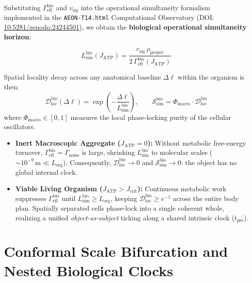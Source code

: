 \documentclass[11pt,a4paper]{article}
\begin{document}
Substituting $\Gamma_{\mathrm{eff}}^{\mathrm{bio}}$ and $v_{\mathrm{sig}}$ into the operational simultaneity formalism implemented in the \texttt{AEON-T14.html} Computational Observatory (DOI: \href{https://doi.org/10.5281/zenodo.24244501}{10.5281/zenodo.24244501}), we obtain the \textbf{biological operational simultaneity horizon}:
\begin{formulabox}
\begin{equation}
L_{\mathrm{sim}}^{\mathrm{bio}}(J_{\mathrm{ATP}}) = \frac{v_{\mathrm{sig}}\,\rho_{\mathrm{proper}}}{2\,\Gamma_{\mathrm{eff}}^{\mathrm{bio}}(J_{\mathrm{ATP}})}
\label{eq:lsim_bio}
\end{equation}
\end{formulabox}
Spatial locality decay across any anatomical baseline $\Delta\ell$ within the organism is then:
\begin{equation}
\mathcal{D}_{\mathrm{loc}}^{\mathrm{bio}}(\Delta\ell) = \exp\!\left(-\frac{\Delta\ell}{L_{\mathrm{sim}}^{\mathrm{bio}}}\right), \qquad \mathcal{S}_{\mathrm{sim}}^{\mathrm{bio}} = \Phi_{\mathrm{macro}} \cdot \mathcal{D}_{\mathrm{loc}}^{\mathrm{bio}}
\label{eq:dloc_bio}
\end{equation}
where $\Phi_{\mathrm{macro}} \in [0, 1]$ measures the local phase-locking purity of the cellular oscillators.

\begin{itemize}
    \item \textbf{Inert Macroscopic Aggregate ($J_{\mathrm{ATP}} = 0$):} Without metabolic free-energy turnover, $\Gamma_{\mathrm{eff}}^{\mathrm{bio}} = \Gamma_{\mathrm{noise}}$ is large, shrinking $L_{\mathrm{sim}}^{\mathrm{bio}}$ to molecular scales ($\sim 10^{-9}\,\mathrm{m} \ll L_{\mathrm{org}}$). Consequently, $\mathcal{D}_{\mathrm{loc}}^{\mathrm{bio}} \to 0$ and $\mathcal{S}_{\mathrm{sim}}^{\mathrm{bio}} \to 0$: the object has no global internal clock.
    \item \textbf{Viable Living Organism ($J_{\mathrm{ATP}} > J_{\mathrm{crit}}$):} Continuous metabolic work suppresses $\Gamma_{\mathrm{eff}}^{\mathrm{bio}}$ until $L_{\mathrm{sim}}^{\mathrm{bio}} \ge L_{\mathrm{org}}$, keeping $\mathcal{D}_{\mathrm{loc}}^{\mathrm{bio}} \ge e^{-1}$ across the entire body plan. Spatially separated cells phase-lock into a single coherent whole, realizing a unified \emph{object-as-subject} ticking along a shared intrinsic clock ($t_{\mathrm{pre}}$).
\end{itemize}

\section{Conformal Scale Bifurcation and Nested Biological Clocks}
\end{document}
